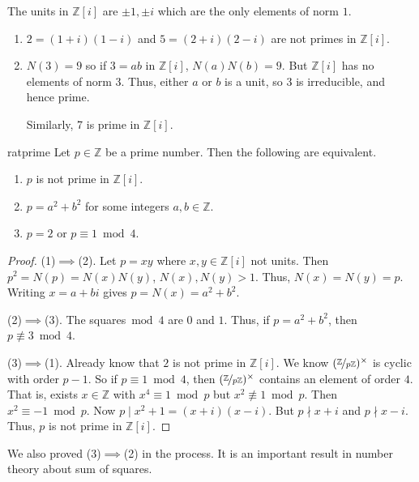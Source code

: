 The units in \(\mathbb{Z}[i]\) are \(\pm 1, \pm i\) which are the only elements of norm \(1\).
\begin{example}
    \begin{enumerate}
        \item \(2 = (1+i)(1-i)\) and \(5 = (2 + i)(2-i)\) are not primes in \(\mathbb{Z}[i]\).
        \item \(N(3) = 9\) so if \(3 = ab\) in \(\mathbb{Z}[i]\), \(N(a)N(b) = 9\). But \(\mathbb{Z}[i]\) has no elements of norm \(3\). Thus, either \(a\) or \(b\) is a unit, so \(3\) is irreducible, and hence prime.
        
        Similarly, 7 is prime in \(\mathbb{Z}[i]\).
    \end{enumerate}
\end{example}
\begin{proposition}{}{ratprime}
    Let \(p \in \mathbb{Z}\) be a prime number. Then the following are equivalent.
    \begin{enumerate}
        \item \(p\) is not prime in \(\mathbb{Z}[i]\).
        \item \(p = a^2 + b^2\) for some integers \(a, b \in \mathbb{Z}\).
        \item \(p = 2\) or \(p \equiv 1 \bmod 4\).
    \end{enumerate}
\end{proposition}
\begin{proof}
    (1)\(\implies\)(2). Let \(p = xy\) where \(x, y \in \mathbb{Z}[i]\) not units. Then \(p^2 = N(p) = N(x)N(y)\), \(N(x),N(y) > 1\). Thus, \(N(x) = N(y) = p\). Writing \(x = a + bi\) gives \(p = N(x) = a^2 + b^2\).

    (2)\(\implies\)(3). The squares\({}\bmod 4\) are \(0\) and \(1\). Thus, if \(p = a^2 + b^2\), then \(p \not\equiv 3 \bmod 4\).
    
    (3)\(\implies\)(1). Already know that \(2\) is not prime in \(\mathbb{Z}[i]\). We know \((\nicefrac{\mathbb{Z}}{p\mathbb{Z}})^\times\) is cyclic with order \(p - 1\). So if \(p \equiv 1 \bmod 4\), then \((\nicefrac{\mathbb{Z}}{p\mathbb{Z}})^\times\) contains an element of order \(4\). That is, exists \(x \in \mathbb{Z}\) with \(x^4 \equiv 1 \bmod p\) but \(x^2 \not \equiv 1 \bmod p\). Then \(x^2 \equiv -1 \bmod p\). Now \(p \mid x^2 + 1 = (x + i)(x - i)\). But \(p \nmid x + i\) and \(p \nmid x - i\). Thus, \(p\) is not prime in \(\mathbb{Z}[i]\).
\end{proof}
\begin{remark}
    We also proved (3)\(\implies\)(2) in the process. It is an important result in number theory about sum of squares.
\end{remark}
